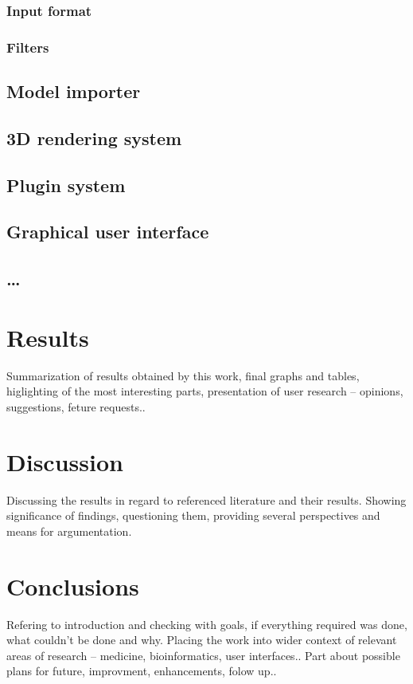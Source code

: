 \subsection{Input format}
\subsection{Filters}
\section{Model importer}
\section{3D rendering system}
\section{Plugin system}
\section{Graphical user interface}
\section{\ldots}
\chapter{Results}
Summarization of results obtained by this work, final graphs and tables,
higlighting of the most interesting parts, presentation of user 
research -- opinions, suggestions,
feture requests..
\chapter{Discussion}
Discussing the results in regard to referenced literature and their results.
Showing significance of findings, questioning them, providing several
perspectives and means for argumentation.
\chapter{Conclusions}
Refering to introduction and checking with goals, if everything required was
done, what couldn't be done and why. Placing the work into wider context of
relevant areas of research -- medicine, bioinformatics, user interfaces..
Part about possible plans for future, improvment, enhancements, folow up..
